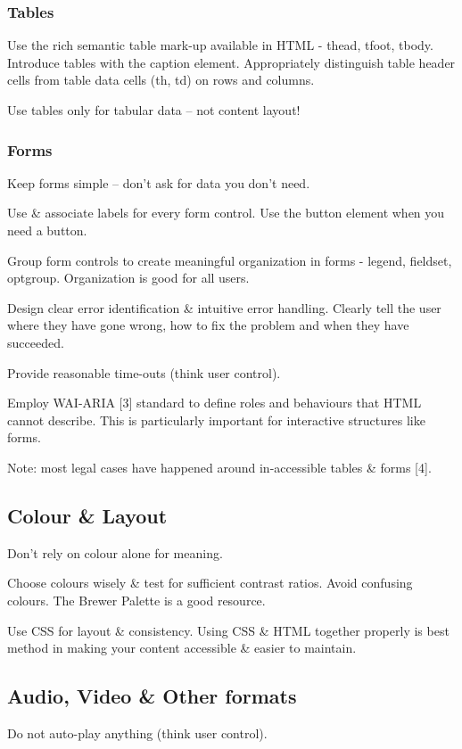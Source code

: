 \documentclass{acm_proc_article-sp}
\begin{document}
\subsubsection{Tables}
Use the rich semantic table mark-up available in HTML - thead, tfoot, tbody. Introduce tables with the caption element. Appropriately distinguish table header cells from table data cells (th, td) on rows and columns.

Use tables only for tabular data – not content layout!

\subsubsection{Forms}
Keep forms simple – don't ask for data you don't need.

Use \& associate labels for every form control. Use the button element when you need a button.

Group form controls to create meaningful organization in forms - legend, fieldset, optgroup. Organization is good for all users.

Design clear error identification \& intuitive error handling. Clearly tell the user where they have gone wrong, how to fix the problem and when they have succeeded.

Provide reasonable time-outs (think user control).

Employ WAI-ARIA [3] standard to define roles and behaviours that HTML cannot describe. This is particularly important for interactive structures like forms.

Note: most legal cases have happened around in-accessible tables \& forms [4].

\subsection{Colour \& Layout}
Don't rely on colour alone for meaning.

Choose colours wisely \& test for sufficient contrast ratios. Avoid confusing colours. The Brewer Palette is a good resource.

Use CSS for layout  \& consistency. Using CSS \& HTML together properly is best method in making your content accessible \& easier to maintain.

\subsection{Audio, Video \& Other formats}
Do not auto-play anything (think user control).
\end{document}
